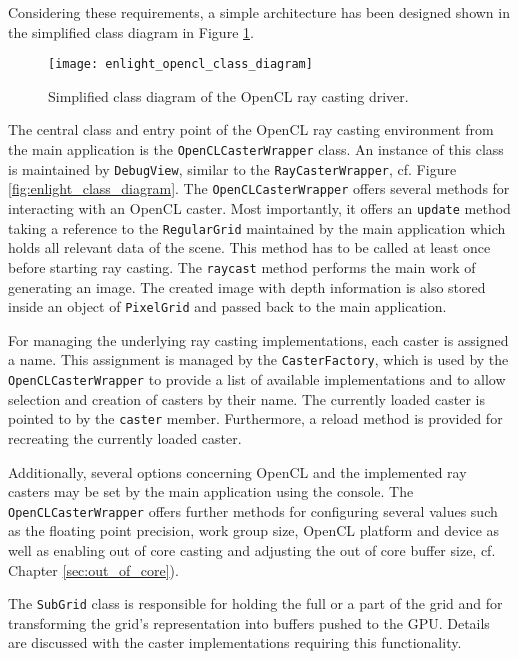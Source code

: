 Considering these requirements, a simple architecture has been designed shown in the simplified class diagram in Figure \ref{fig:enlight_opencl_class_diagram}.

\begin{figure}[h]
\centering
\texttt{[image: enlight\_opencl\_class\_diagram]}
\caption{Simplified class diagram of the OpenCL ray casting driver.}
\label{fig:enlight_opencl_class_diagram}
\end{figure}

The central class and entry point of the OpenCL ray casting environment from the main application is the \lstinline!OpenCLCasterWrapper! class. An instance of this class is maintained by \lstinline!DebugView!, similar to the \lstinline!RayCasterWrapper!, cf. Figure \ref{fig:enlight_class_diagram}. The \lstinline!OpenCLCasterWrapper! offers several methods for interacting with an OpenCL caster. Most importantly, it offers an \lstinline!update! method taking a reference to the \lstinline!RegularGrid! maintained by the main application which holds all relevant data of the scene. This method has to be called at least once before starting ray casting. The \lstinline!raycast! method performs the main work of generating an image. The created image with depth information is also stored inside an object of \lstinline!PixelGrid! and passed back to the main application.

For managing the underlying ray casting implementations, each caster is assigned a name. This assignment is managed by the \lstinline!CasterFactory!, which is used by the \lstinline!OpenCLCasterWrapper! to provide a list of available implementations and to allow selection and creation of casters by their name. The currently loaded caster is pointed to by the \lstinline!caster! member. Furthermore, a reload method is provided for recreating the currently loaded caster.

Additionally, several options concerning OpenCL and the implemented ray casters may be set by the main application using the console. The \lstinline!OpenCLCasterWrapper! offers further methods for configuring several values such as the floating point precision, work group size, OpenCL platform and device as well as enabling out of core casting and adjusting the out of core buffer size, cf. Chapter \ref{sec:out_of_core}).

The \lstinline!SubGrid! class is responsible for holding the full or a part of the grid and for transforming the grid's representation into buffers pushed to the GPU. Details are discussed with the caster implementations requiring this functionality.

